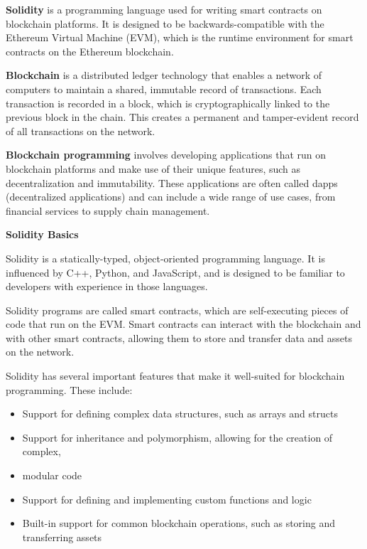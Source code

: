 \documentclass{article}
\theoremstyle{theorem}
\theoremstyle{definition}
\theoremstyle{remark}
\begin{document}

{\bf Solidity} is a programming language used for writing smart contracts on blockchain platforms. It is designed to be backwards-compatible with the Ethereum Virtual Machine (EVM), which is the runtime environment for smart contracts on the Ethereum blockchain.

\medskip\noindent
{\bf Blockchain} is a distributed ledger technology that enables a network of computers to maintain a shared, immutable record of transactions. Each transaction is recorded in a block, which is cryptographically linked to the previous block in the chain. This creates a permanent and tamper-evident record of all transactions on the network.

\medskip\noindent
{\bf Blockchain programming} involves developing applications that run on blockchain platforms and make use of their unique features, such as decentralization and immutability. These applications are often called dapps (decentralized applications) and can include a wide range of use cases, from financial services to supply chain management.

\medskip\noindent
{\bf Solidity Basics}

\medskip\noindent
Solidity is a statically-typed, object-oriented programming language. It is influenced by C++, Python, and JavaScript, and is designed to be familiar to developers with experience in those languages.

\medskip\noindent
Solidity programs are called smart contracts, which are self-executing pieces of code that run on the EVM. Smart contracts can interact with the blockchain and with other smart contracts, allowing them to store and transfer data and assets on the network.

\medskip\noindent
Solidity has several important features that make it well-suited for blockchain programming. These include:

\medskip\noindent
\begin{itemize}
\item Support for defining complex data structures, such as arrays and structs
\item Support for inheritance and polymorphism, allowing for the creation of complex, \item modular code
\item Support for defining and implementing custom functions and logic
\item Built-in support for common blockchain operations, such as storing and transferring assets
\end{itemize}
\end{document}
